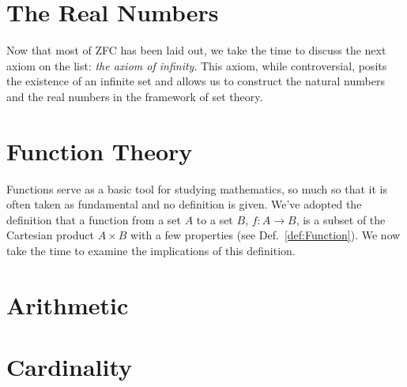         \chapter{The Real Numbers}
        Now that most of ZFC has been laid out, we take the time to discuss the
        next axiom on the list:
        \textit{the axiom of infinity}. This axiom,
        while controversial, posits the existence of an infinite set and allows
        us to construct the natural numbers and the real numbers in the
        framework of set theory.
    \chapter{Function Theory}
        \label{chapt:Function_Theory}%
        Functions serve as a basic tool for studying mathematics, so much so
        that it is often taken as fundamental and no definition is given. We've
        adopted the definition that a function from a set $A$ to
        a set $B$, $f:A\rightarrow{B}$, is a subset of the Cartesian product
        $A\times{B}$ with a few properties (see Def.~\ref{def:Function}). We now
        take the time to examine the implications of this definition.
        
        
        
        
    \chapter{Arithmetic}
        
        
    \chapter{Cardinality}
        
    \renewcommand{\PATH}{\OLDPATH}
\endgroup